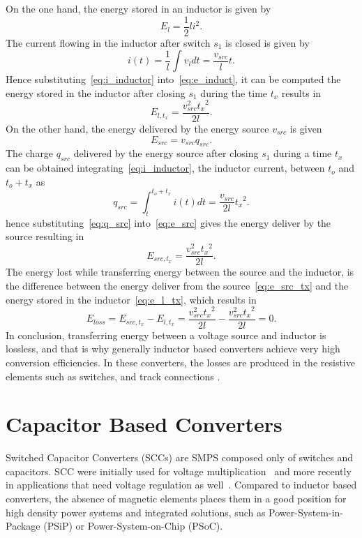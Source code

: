 On the one hand, the energy stored in an inductor is given by
\begin{equation}
E_l = \frac{1}{2} l i^2.
\label{eq:e_induct}
\end{equation}
The current flowing in the inductor after switch $s_1$ is closed is given by
\begin{equation}
i(t)= \frac{1}{l} \int v_l dt = \frac{v_{src}}{l}t.
\label{eq:i_inductor}
\end{equation}
Hence substituting~\eqref{eq:i_inductor} into~\eqref{eq:e_induct}, it can be computed the energy stored in the inductor after closing $s_1$ during the time $t_x$ results in
\begin{equation}
E_{l,t_x}= \frac{v_{src}^2{t_x}^2}{2l} .
\label{eq:e_l_tx}
\end{equation}
On the other hand, the energy delivered by the energy source $v_{src}$ is given
\begin{equation}
E_{src} = v_{src} q_{src}.
\label{eq:e_src}
\end{equation}
The charge $q_{src}$ delivered by the energy source after closing $s_1$ during a time $t_x$ can be obtained integrating~\eqref{eq:i_inductor}, the inductor current,  between $t_o$ and $t_o+t_x$ as
\begin{equation}
q_{src} = \int_t^{t_o+t_x} i(t) dt = \frac{v_{src}}{2l}{t_x}^2 .
\label{eq:q_src}
\end{equation}
hence substituting~\eqref{eq:q_src} into~\eqref{eq:e_src} gives the energy deliver by the source resulting in
\begin{equation}
E_{src,t_x} = \frac{v_{src}^2{t_x}^2}{2l}.
\label{eq:e_src_tx}
\end{equation}
The energy lost while transferring energy between the source and the inductor, is the difference between the energy deliver from the source~\eqref{eq:e_src_tx} and the energy stored in the inductor~\eqref{eq:e_l_tx}, which results in
\begin{equation}
E_{loss} = E_{src,t_x} - E_{l,t_x} = \frac{v_{src}^2{t_x}^2}{2l} - \frac{v_{src}^2{t_x}^2}{2l} =0.
\label{eq:e_loss_l}
\end{equation}
In conclusion, transferring energy between a voltage source and inductor is lossless, and that is why generally inductor based converters achieve very high conversion efficiencies. In these converters, the losses are produced in the resistive elements such as switches, and track connections .

\section{Capacitor Based Converters }
Switched Capacitor Converters (SCCs) are SMPS composed only of switches and capacitors. SCC were initially used for voltage multiplication~\cite{30Cockcroft,44Waidelich,76Dickson} and more recently in applications that need voltage regulation as well~\cite{Ng:EECS-2011-94}. Compared to inductor based converters, the absence of magnetic elements places them in a good position for high density power systems and integrated solutions, such as Power-System-in-Package (PSiP) or Power-System-on-Chip (PSoC).

